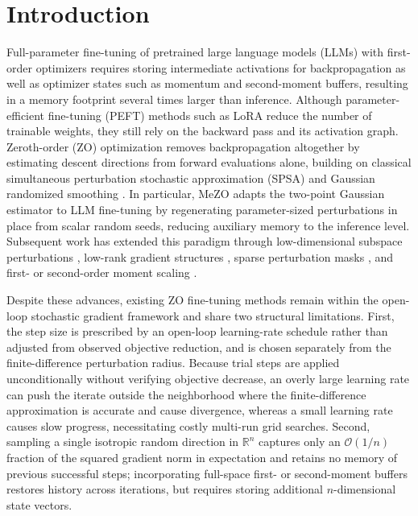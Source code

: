 \documentclass[smallextended]{svjour3}
\begin{document}
\section{Introduction}
\label{sec:intro}

Full-parameter fine-tuning of pretrained large language models (LLMs) \cite{zhang2022opt} with first-order optimizers requires storing intermediate activations for backpropagation as well as optimizer states such as momentum and second-moment buffers, resulting in a memory footprint several times larger than inference. Although parameter-efficient fine-tuning (PEFT) methods such as LoRA \cite{hu2022lora} reduce the number of trainable weights, they still rely on the backward pass and its activation graph. Zeroth-order (ZO) optimization removes backpropagation altogether by estimating descent directions from forward evaluations alone, building on classical simultaneous perturbation stochastic approximation (SPSA) \cite{spall1992multivariate} and Gaussian randomized smoothing \cite{duchi2015optimal,ghadimi2013stochastic,nesterov2017random}. In particular, MeZO \cite{malladi2023mezo} adapts the two-point Gaussian estimator to LLM fine-tuning by regenerating parameter-sized perturbations in place from scalar random seeds, reducing auxiliary memory to the inference level. Subsequent work has extended this paradigm through low-dimensional subspace perturbations \cite{yu2024subzero}, low-rank gradient structures \cite{chen2024enhancing}, sparse perturbation masks \cite{liu2024sparse}, and first- or second-order moment scaling \cite{chen2019zo,zhao2024second}.

Despite these advances, existing ZO fine-tuning methods remain within the open-loop stochastic gradient framework and share two structural limitations. First, the step size is prescribed by an open-loop learning-rate schedule rather than adjusted from observed objective reduction, and is chosen separately from the finite-difference perturbation radius. Because trial steps are applied unconditionally without verifying objective decrease, an overly large learning rate can push the iterate outside the neighborhood where the finite-difference approximation is accurate and cause divergence, whereas a small learning rate causes slow progress, necessitating costly multi-run grid searches. Second, sampling a single isotropic random direction in $\mathbb{R}^n$ captures only an $\mathcal{O}(1/n)$ fraction of the squared gradient norm in expectation and retains no memory of previous successful steps; incorporating full-space first- or second-moment buffers \cite{chen2019zo,zhao2024second} restores history across iterations, but requires storing additional $n$-dimensional state vectors.
\end{document}
